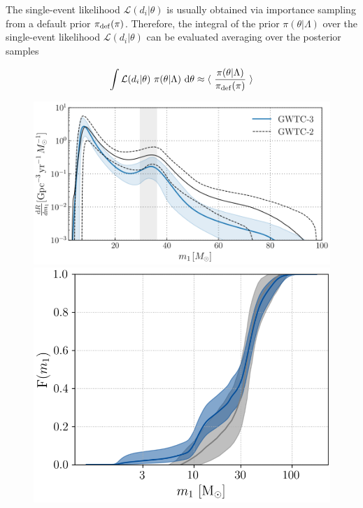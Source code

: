 \documentclass[a4paper,titlepage]{book}     	%
\begin{document}
The single-event likelihood $\mathcal{L}(d_i|\theta)$ is usually obtained via importance sampling from a default prior $\pi_{\rm def}(\pi)$. Therefore, the integral of the prior $\pi(\theta|\Lambda)$ over the single-event likelihood $\mathcal{L}(d_i|\theta)$ can be evaluated averaging over the posterior samples

\begin{equation}
   \int \mathcal{L}(d_i|\theta)~\pi(\theta|\Lambda)~\rm d\theta \approx \langle~ \frac{\pi(\theta|\Lambda)}{\pi_{\rm def}(\pi)}~\rangle
\end{equation}


\begin{figure}
	\begin{minipage}{.60\textwidth}
		\centering
		\includegraphics[width=\textwidth]{./images/MassMergerRate.png}
	\end{minipage}
	\hfill
	\begin{minipage}{.39\textwidth}
		\vspace{1mm}
		\centering
		\includegraphics[width=\textwidth]{./images/MassCumulative.png}	

\end{minipage}
\end{figure}
\end{document}
